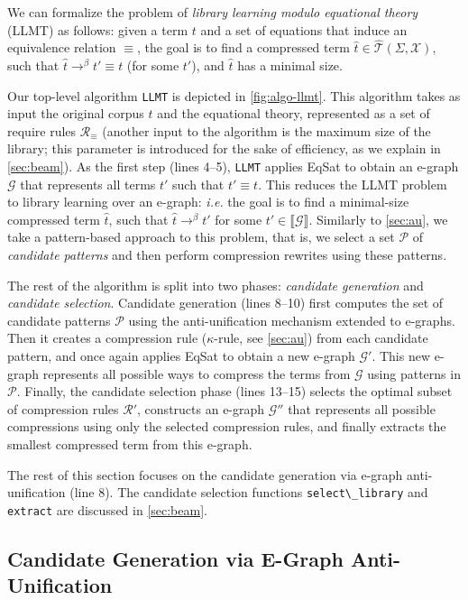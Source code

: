 \documentclass[acmsmall,screen,nonacm,review=false,timestamp=false]{acmart}
\newcommand{\ie}{\emph{i.e.}\xspace}
\newcommand{\T}[1]{\mbox{\lstinline^#1^}}
\newcommand{\semeq}{\equiv}
\newcommand{\absof}[2]{\hat{\mathcal{T}}(#1,#2)}
\newcommand{\rewrites}[1]{\rightarrow^{#1}}
\newcommand{\evals}{\rewrites{\beta}}
\newcommand{\denot}[1]{\llbracket #1 \rrbracket}
\newcommand{\ruleset}{\mathcal{R}}
\newcommand{\patset}{\mathcal{P}}
\begin{document}
 
We can formalize the problem of \emph{library learning modulo equational theory} (LLMT) as follows:
given a term $t$ and a set of equations that induce an equivalence relation $\semeq$,
the goal is to find a compressed term $\hat{t} \in \absof{\Sigma}{\mathcal{X}}$,
such that $\hat{t} \evals t' \semeq t$ (for some $t'$),
and $\hat{t}$ has a minimal size.



Our top-level algorithm \T{LLMT} is depicted in \autoref{fig:algo-llmt}.
This algorithm takes as input the original corpus $t$ 
and the equational theory, represented as a set of require rules $\ruleset_\semeq$
(another input to the algorithm is the maximum size of the library;
this parameter is introduced for the sake of efficiency, as we explain in \autoref{sec:beam}).
As the first step (lines 4--5),
\T{LLMT} applies EqSat to obtain an e-graph $\mathcal{G}$ 
that represents all terms $t'$ such that $t' \semeq t$.
This reduces the LLMT problem to library learning over an e-graph:
\ie the goal is to find a minimal-size compressed term $\hat{t}$,
such that $\hat{t} \evals t'$ for some $t' \in \denot{\mathcal{G}}$.
Similarly to \autoref{sec:au},
we take a pattern-based approach to this problem,
that is, we select a set $\patset$ of \emph{candidate patterns}
and then perform compression rewrites using these patterns.

The rest of the algorithm is split into two phases:
\emph{candidate generation} and \emph{candidate selection}.
Candidate generation (lines 8--10)
first computes the set of candidate patterns $\patset$ using the anti-unification mechanism extended to e-graphs.
Then it creates a compression rule ($\kappa$-rule, see \autoref{sec:au}) from each candidate pattern,
and once again applies EqSat to obtain a new e-graph $\mathcal{G}'$.
This new e-graph represents all possible ways to compress the terms from $\mathcal{G}$ 
using patterns in $\patset$.
Finally, the candidate selection phase (lines 13--15)
selects the optimal subset of compression rules $\ruleset'$,
constructs an e-graph $\mathcal{G}''$ that represents all possible compressions using only the selected compression rules,
and finally extracts the smallest compressed term from this e-graph.

The rest of this section focuses on the candidate generation via e-graph anti-unification
(line 8).
The candidate selection functions \T{select\_library} and \T{extract} are discussed in \autoref{sec:beam}.

\subsection{Candidate Generation via E-Graph Anti-Unification}
\end{document}

